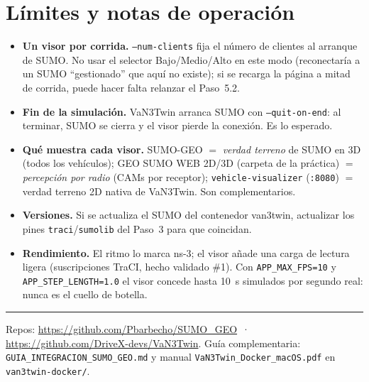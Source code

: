 \documentclass[11pt,a4paper]{article}
\begin{document}
\section{Límites y notas de operación}

\begin{itemize}[leftmargin=1.4em, itemsep=2pt]
  \item \textbf{Un visor por corrida.} \texttt{--num-clients} fija el número de clientes al
        arranque de SUMO. No usar el selector Bajo/Medio/Alto en este modo (reconectaría a
        un SUMO ``gestionado'' que aquí no existe); si se recarga la página a mitad de
        corrida, puede hacer falta relanzar el Paso~5.2.
  \item \textbf{Fin de la simulación.} VaN3Twin arranca SUMO con \texttt{--quit-on-end}:
        al terminar, SUMO se cierra y el visor pierde la conexión. Es lo esperado.
  \item \textbf{Qué muestra cada visor.} SUMO-GEO $=$ \emph{verdad terreno} de SUMO en 3D
        (todos los vehículos); GEO SUMO WEB 2D/3D (carpeta de la práctica) $=$
        \emph{percepción por radio} (CAMs por receptor); \texttt{vehicle-visualizer}
        (\texttt{:8080}) $=$ verdad terreno 2D nativa de VaN3Twin. Son complementarios.
  \item \textbf{Versiones.} Si se actualiza el SUMO del contenedor van3twin, actualizar
        los pines \texttt{traci}/\texttt{sumolib} del Paso~3 para que coincidan.
  \item \textbf{Rendimiento.} El ritmo lo marca ns-3; el visor añade una carga de lectura
        ligera (suscripciones TraCI, hecho validado \#1). Con \texttt{APP\_MAX\_FPS=10} y
        \texttt{APP\_STEP\_LENGTH=1.0} el visor concede hasta 10~s simulados por segundo
        real: nunca es el cuello de botella.
\end{itemize}

\vspace{6pt}
\hrule
\vspace{4pt}
{\small\color{gris} Repos: \url{https://github.com/Pbarbecho/SUMO_GEO} \,·\,
\url{https://github.com/DriveX-devs/VaN3Twin}. Guía complementaria:
\texttt{GUIA\_INTEGRACION\_SUMO\_GEO.md} y manual
\texttt{VaN3Twin\_Docker\_macOS.pdf} en \texttt{van3twin-docker/}.}
\end{document}
